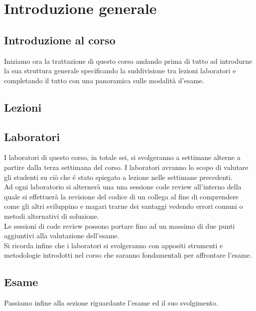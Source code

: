 \documentclass[../main.tex]{subfiles}
\begin{document}
\clearpage
\thispagestyle{empty}
\vspace*{7cm}
\section{Introduzione generale}
\vspace*{1.5cm}



\subsection{Introduzione al corso}

Iniziamo ora la trattazione di questo corso andando prima di tutto ad introdurne la sua struttura generale specificando la suddivisione tra lezioni laboratori e completando il tutto con una panoramica sulle modalità d'esame.\\


\subsection{Lezioni}




\subsection{Laboratori}

I laboratori di questo corso, in totale sei, si svolgeranno a settimane alterne a partire dalla terza settimana del corso. I laboratori avranno lo scopo di valutare gli studenti su ciò che é stato spiegato a lezione nelle settimane precedenti.\\
Ad ogni laboratorio si alternerà una una sessione code review all'interno della quale si effettuerà la revisione del codice di un collega al fine di comprendere come gli altri sviluppino e magari trarne dei vantaggi vedendo errori comuni o metodi alternativi di soluzione.\\
Le sessioni di code review possono portare fino ad un massimo di due punti aggiuntivi alla valutazione dell'esame.\\
Si ricorda infine che i laboratori si svolgeranno con appositi strumenti e metodologie introdotti nel corso che saranno fondamentali per affrontare l'esame.\\

\subsection{Esame}

Passiamo infine alla sezione riguardante l'esame ed il suo svolgimento.






	
\end{document}
